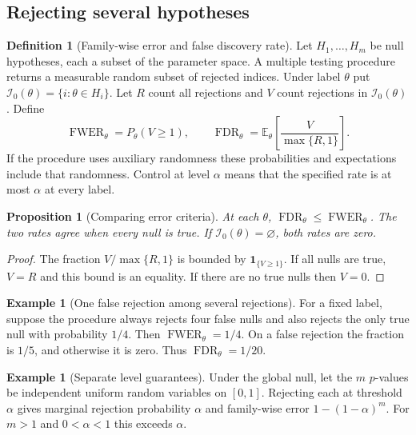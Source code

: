 \documentclass[11pt,oneside]{book}
\newtheorem{proposition}[theorem]{Proposition}
\theoremstyle{definition}
\newtheorem{definition}[theorem]{Definition}
\newtheorem{example}[theorem]{Example}
\theoremstyle{remark}
\begin{document}
\subsection{Rejecting several hypotheses}
\label{subsec:multiple-testing-errors}

\begin{definition}[Family-wise error and false discovery rate]
\label{def:fwer-fdr}
Let $H_1,\ldots,H_m$ be null hypotheses, each a subset of the
parameter space. A multiple testing procedure returns a measurable
random subset of rejected indices. Under label $\theta$ put
$\mathcal I_0(\theta)=\{i:\theta\in H_i\}$. Let $R$ count all
rejections and $V$ count rejections in $\mathcal I_0(\theta)$. Define
\[
\operatorname{FWER}_\theta=P_\theta(V\geq1),\qquad
\operatorname{FDR}_\theta=\mathbb E_\theta\!\left[\frac{V}{\max\{R,1\}}\right].
\]
If the procedure uses auxiliary randomness these probabilities and
expectations include that randomness. Control at level $\alpha$
means that the specified rate is at most $\alpha$ at every label.
\end{definition}

\begin{proposition}[Comparing error criteria]
\label{prop:fdr-fwer-comparison}
At each $\theta$, $\operatorname{FDR}_\theta\leq
\operatorname{FWER}_\theta$. The two rates agree when every
null is true. If $\mathcal I_0(\theta)=\varnothing$, both
rates are zero.
\end{proposition}
\begin{proof}
The fraction $V/\max\{R,1\}$ is bounded by $\mathbf 1_{\{V\geq1\}}$.
If all nulls are true, $V=R$ and this bound is an equality.
If there are no true nulls then $V=0$.
\end{proof}

\begin{example}[One false rejection among several rejections]
\label{ex:fdr-fwer-separated}
For a fixed label, suppose the procedure always rejects four
false nulls and also rejects the only true null with probability
$1/4$. Then $\operatorname{FWER}_\theta=1/4$. On a false
rejection the fraction is $1/5$, and otherwise it is zero.
Thus $\operatorname{FDR}_\theta=1/20$.
\end{example}

\begin{example}[Separate level guarantees]
\label{ex:multiple-independent-null-unadjusted}
Under the global null, let the $m$ $p$-values be independent
uniform random variables on $[0,1]$. Rejecting each at threshold
$\alpha$ gives marginal rejection probability $\alpha$ and
family-wise error $1-(1-\alpha)^m$. For $m>1$ and $0<\alpha<1$
this exceeds $\alpha$.
\end{example}
\end{document}
